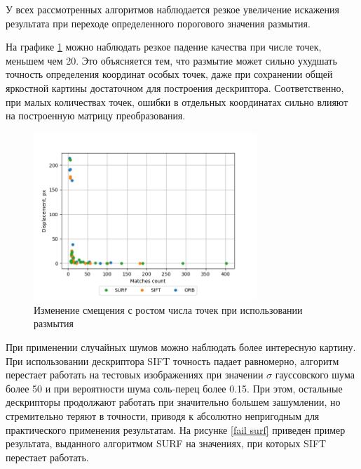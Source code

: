 {{{    У всех рассмотренных алгоритмов наблюдается резкое увеличение искажения результата при переходе определенного порогового значения размытия.
    
    На графике \ref{blur d by m} можно наблюдать резкое падение качества при числе точек, меньшем чем 20. Это объясняется тем, что размытие может сильно ухудшать точность определения координат особых точек, даже при сохранении общей яркостной картины достаточном для построения дескриптора. Соответственно, при малых количествах точек, ошибки в отдельных координатах сильно влияют на построенную матрицу преобразования.
    
    \begin{figure}[H]
    	\centering                             
    	\includegraphics[width=0.75\textwidth,keepaspectratio]{ex1/Rand_noises_d_by_m.png}      
    	\centering\caption{  Изменение смещения с ростом числа точек при использовании размытия}
    	\label{blur d by m}    
	\end{figure} 
	
	При применении случайных шумов можно наблюдать более интересную картину. При использовании дескриптора SIFT точность падает равномерно, алгоритм перестает работать на тестовых изображениях при значении $\sigma$ гауссовского шума более 50 и при вероятности шума соль-перец более 0.15. При этом, остальные дескрипторы продолжают работать при значительно большем зашумлении, но стремительно теряют в точности, приводя к абсолютно непригодным для практического применения результатам. На рисунке \ref{fail surf} приведен пример результата, выданного алгоритмом SURF на значениях, при которых SIFT перестает работать. 
	
}}}
